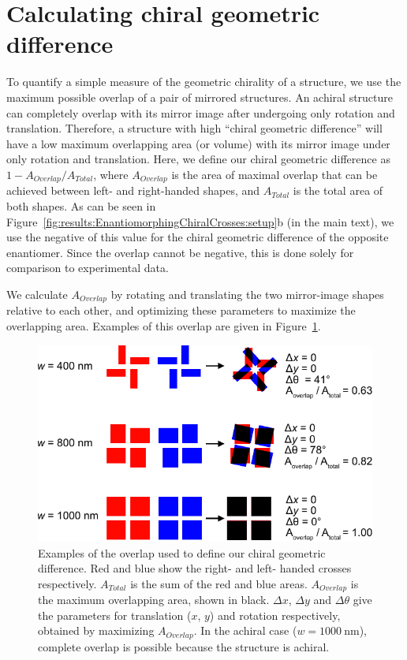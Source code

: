 \section{Calculating chiral geometric difference}\label{sec:appendix:ChiralGeoDiff}

To quantify a simple measure of the geometric chirality of a structure, we use the maximum possible overlap of a pair of mirrored structures. An achiral structure can completely overlap with its mirror image after undergoing only rotation and translation. Therefore, a structure with high ``chiral geometric difference'' will have a low maximum overlapping area (or volume) with its mirror image under only rotation and translation. Here, we define our chiral geometric difference as $1 - A_{Overlap} / A_{Total}$,
where $A_{Overlap}$ is the area of maximal overlap that can be achieved between left- and right-handed shapes, and $A_{Total}$ is the total area of both shapes. 
As can be seen in Figure~\ref{fig:results:EnantiomorphingChiralCrosses:setup}b (in the main text), we use the negative of this value for the chiral geometric difference of the opposite enantiomer. Since the overlap cannot be negative, this is done solely for comparison to experimental data.

We calculate $A_{Overlap}$ by rotating and translating the two mirror-image shapes relative to each other, and optimizing these parameters to maximize the overlapping area. Examples of this overlap are given in Figure~\ref{fig:appendix:ChiralGeoDiff}.

\begin{figure}[htb!]	
    \centering	
    \includegraphics[scale=0.8]{./figures/results/EnantiomorphingChiralCrosses/geoDiff.pdf}
    \caption{\label{fig:appendix:ChiralGeoDiff}
    Examples of the overlap used to define our chiral geometric difference. Red and blue show the right- and left- handed crosses respectively.   $A_{Total}$ is the sum of the red and blue areas. $A_{Overlap}$ is the maximum overlapping area, shown in black. $\Delta x$, $\Delta y$ and $\Delta \theta$ give the parameters for translation ($x$, $y$) and rotation respectively, obtained by maximizing $A_{Overlap}$. In the achiral case ($w=\SI{1000}{\nano\m}$), complete overlap is possible because the structure is achiral. }	
\end{figure}

